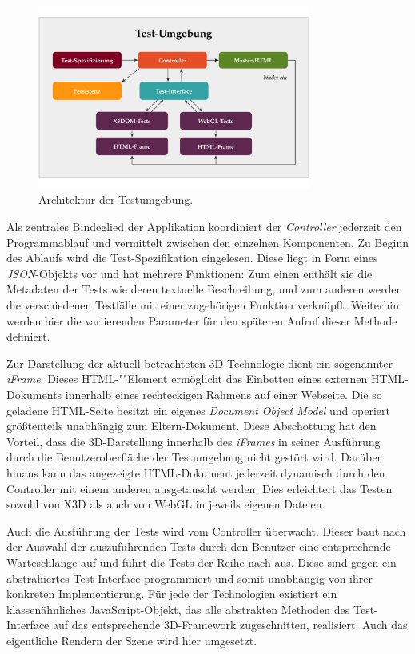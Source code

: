 \begin{figure}[!h]
	\centering
	\includegraphics[width=0.8\textwidth]{kap5/figures/test-env-architecture-crop.pdf}
	\caption{Architektur der Testumgebung.}
	\label{FIG:TEST_ENV_ARCHITECTURE}
\end{figure}

Als zentrales Bindeglied der Applikation koordiniert der \emph{Controller} jederzeit den Programmablauf und vermittelt zwischen den einzelnen Komponenten.
Zu Beginn des Ablaufs wird die Test-Spezifikation eingelesen. Diese liegt in Form eines \emph{JSON}-Objekts vor und hat mehrere Funktionen: Zum einen enthält sie die Metadaten der Tests  wie deren textuelle Beschreibung, und zum anderen werden die verschiedenen Testfälle mit einer zugehörigen Funktion verknüpft. Weiterhin werden hier die variierenden Parameter für den späteren Aufruf dieser Methode definiert.

Zur Darstellung der aktuell betrachteten 3D-Technologie dient ein sogenannter \emph{iFrame}. Dieses HTML-""Element ermöglicht das Einbetten eines externen HTML-Dokuments innerhalb eines rechteckigen Rahmens auf einer Webseite. Die so geladene HTML-Seite besitzt ein eigenes \emph{Document Object Model} und operiert größtenteils unabhängig zum Eltern-Dokument. Diese Abschottung hat den Vorteil, dass die 3D-Darstellung innerhalb des \emph{iFrames} in seiner Ausführung durch die Benutzeroberfläche der Testumgebung nicht gestört wird. Darüber hinaus kann das angezeigte HTML-Dokument jederzeit dynamisch durch den Controller mit einem anderen ausgetauscht werden. Dies erleichtert das Testen sowohl von X3D als auch von WebGL in jeweils eigenen Dateien.

Auch die Ausführung der Tests wird vom Controller überwacht. Dieser baut nach der Auswahl der auszuführenden Tests durch den Benutzer eine entsprechende Warteschlange auf und führt die Tests der Reihe nach aus.
Diese sind gegen ein abstrahiertes Test-Interface programmiert und somit unabhängig von ihrer konkreten Implementierung. Für jede der Technologien existiert ein klassenähnliches JavaScript-Objekt, das alle abstrakten Methoden des Test-Interface auf das entsprechende 3D-Framework zugeschnitten, realisiert. Auch das eigentliche Rendern der Szene wird hier umgesetzt.

